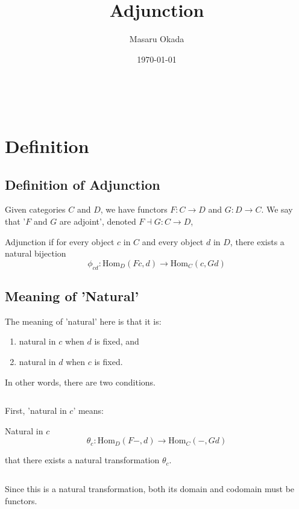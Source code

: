 \documentclass[uplatex,a4j,12pt,dvipdfmx]{jsarticle}
\title{
Adjunction
}
\author{Masaru Okada}
\date{\today}
\begin{document}
\maketitle

\tableofcontents

\ \\

\section{Definition}

\subsection{Definition of Adjunction}

Given categories $C$ and $D$,
we have functors $F: C \to D$ and $G: D \to C$.
We say that '$F$ and $G$ are adjoint',
denoted $F \dashv G : C \to D$,

\begin{itembox}[l]{Adjunction}
	if for every object $c$ in $C$ and every object $d$ in $D$, there exists a natural bijection
	$$
		\phi_{cd} : \mathrm{Hom}_{D}(Fc,d) \to \mathrm{Hom}_{C}(c,Gd)
	$$
\end{itembox}

\subsection{Meaning of 'Natural'}

The meaning of 'natural' here is that it is:
\begin{enumerate}
	\item natural in $c$ when $d$ is fixed, and
	\item natural in $d$ when $c$ is fixed.
\end{enumerate}
In other words, there are two conditions.

${}$


First, 'natural in $c$' means:

\begin{itembox}[l]{Natural in $c$}
	$$
		\theta_{c} : \mathrm{Hom}_{D}(F-,d) \to \mathrm{Hom}_{C}(-,Gd)
	$$

	that there exists a natural transformation $\theta_{c}$.
\end{itembox}

${}$

Since this is a natural transformation, both its domain and codomain must be functors.
\end{document}
